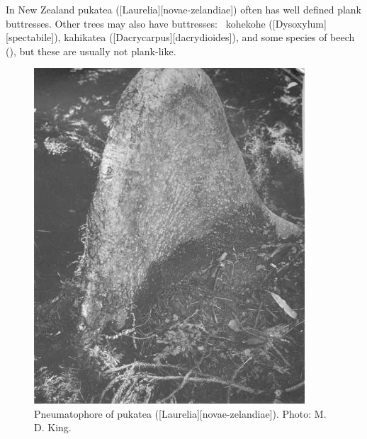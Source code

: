 In New Zealand pukatea ([Laurelia][novae-zelandiae]) often has well defined plank buttresses.
Other trees may also have buttresses: \eg\ kohekohe ([Dysoxylum][spectabile]), kahikatea ([Dacrycarpus][dacrydioides]), and some species of beech (), but these are usually not plank-like.

\begin{figure}[!htb]
	\centering
	\begin{minipage}[t]{0.54\textwidth}
		\centering
		\includegraphics[width=0.9\textwidth]{graphics/figure10pukatea.jpg}
    	\caption[Pneumatophore of pukatea]{Pneumatophore of pukatea ([Laurelia][novae-zelandiae]).
    	Photo:  M. D. King.}%
    	\label{fig:10pukatea}
	\end{minipage}\hfill%
	\begin{minipage}[t]{0.44\textwidth}
    	\centering

\end{minipage}
\end{figure}
